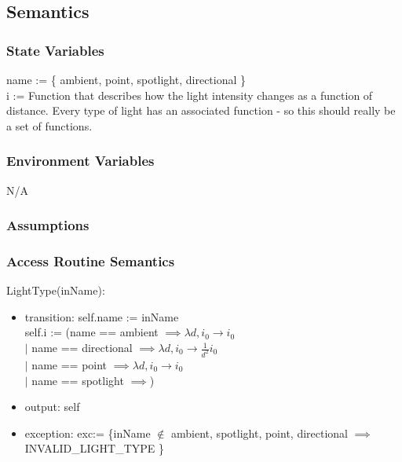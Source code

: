 \documentclass[12pt, titlepage]{article}
\begin{document}

\subsection{Semantics}
\subsubsection{State Variables}
name := \{ ambient, point, spotlight, directional \} \\
i := Function that describes how the light intensity changes as a function of 
distance. Every type of light has an associated function - so this should 
really be a set of functions.\\

\subsubsection{Environment Variables}
N/A

\subsubsection{Assumptions}

\subsubsection{Access Routine Semantics}
\noindent LightType(inName):
\begin{itemize}
	\item transition: self.name := inName \\
					  self.i := (name == ambient $\implies \lambda d, i_{0} \to 
					  i_{0}$ \\
					  $|$  name == directional $\implies \lambda d, i_{0} \to 
					  \frac{1}{d^2}i_{0}$ \\
					  $|$ name == point $\implies \lambda d, i_{0} \to 
					  i_{0}$\\
					  $|$ name == spotlight $\implies$)
	\item output: self
	\item exception: exc:= \{inName $\notin$ {ambient, spotlight, point, 
	directional} $\implies$ INVALID\_LIGHT\_TYPE \}
\end{itemize}
\end{document}
